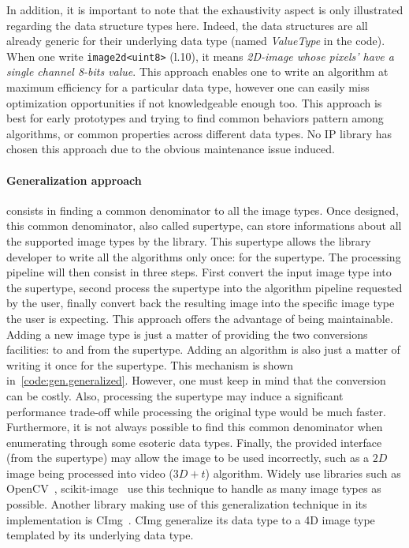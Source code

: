 In addition, it is important to note that the exhaustivity aspect is only illustrated regarding the data structure types
here. Indeed, the data structures are all already generic for their underlying data type (named \emph{ValueType} in the
code). When one write \texttt{image2d<uint8>} (l.10), it means \emph{2D-image whose pixels' have a single channel 8-bits
  value}. This approach enables one to write an algorithm at maximum efficiency for a particular data type, however one
can easily miss optimization opportunities if not knowledgeable enough too. This approach is best for early prototypes
and trying to find common behaviors pattern among algorithms, or common properties across different data types. No IP
library has chosen this approach due to the obvious maintenance issue induced.

\paragraph{Generalization approach} consists in finding a common denominator to all the image types. Once designed, this
common denominator, also called supertype, can store informations about all the supported image types by the library.
This supertype allows the library developer to write all the algorithms only once: for the supertype. The processing
pipeline will then consist in three steps. First convert the input image type into the supertype, second process the
supertype into the algorithm pipeline requested by the user, finally convert back the resulting image into the specific
image type the user is expecting. This approach offers the advantage of being maintainable. Adding a new image type is
just a matter of providing the two conversions facilities: to and from the supertype. Adding an algorithm is also just a
matter of writing it once for the supertype. This mechanism is shown in~\ref{code:gen.generalized}. However, one must
keep in mind that the conversion can be costly. Also, processing the supertype may induce a significant performance
trade-off while processing the original type would be much faster. Furthermore, it is not always possible to find this
common denominator when enumerating through some esoteric data types. Finally, the provided interface (from the
supertype) may allow the image to be used incorrectly, such as a $2D$ image being processed into video ($3D+t$)
algorithm. Widely use libraries such as OpenCV~\cite{bradski.2000.opencv}, scikit-image~\cite{vanderwalt.2014.skimage}
use this technique to handle as many image types as possible. Another library making use of this generalization
technique in its implementation is CImg~\cite{tschumperle.2012.cimg}. CImg generalize its data type to a 4D image type
templated by its underlying data type.

